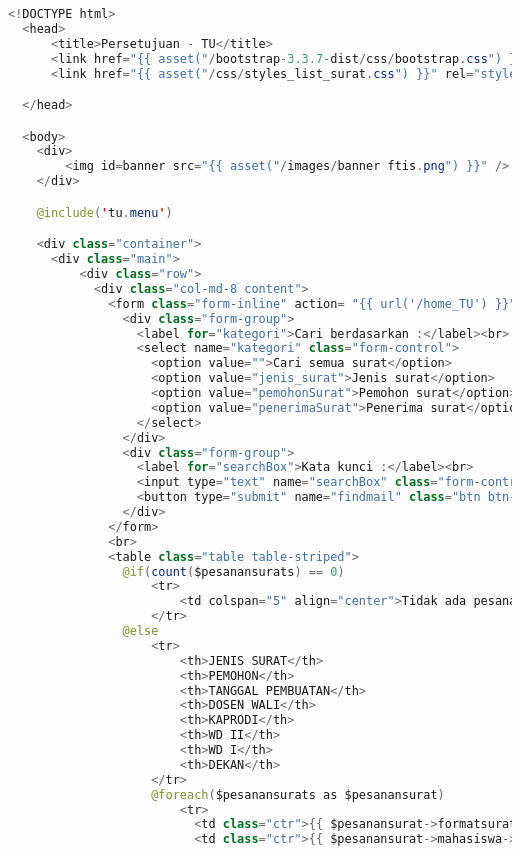 \begin{lstlisting}[language=Java,basicstyle=\tiny,caption=Persetujuan surat]
<!DOCTYPE html>
  <head>
      <title>Persetujuan - TU</title>
      <link href="{{ asset("/bootstrap-3.3.7-dist/css/bootstrap.css") }}" rel="stylesheet" type="text/css" />
      <link href="{{ asset("/css/styles_list_surat.css") }}" rel="stylesheet" type="text/css">

  </head>

  <body>
    <div>
        <img id=banner src="{{ asset("/images/banner ftis.png") }}" />
    </div>

    @include('tu.menu')

    <div class="container">
      <div class="main">
          <div class="row">
            <div class="col-md-8 content">
              <form class="form-inline" action= "{{ url('/home_TU') }}" method="get">
                <div class="form-group">
                  <label for="kategori">Cari berdasarkan :</label><br>
                  <select name="kategori" class="form-control">
                    <option value="">Cari semua surat</option>
                    <option value="jenis_surat">Jenis surat</option>
                    <option value="pemohonSurat">Pemohon surat</option>
                    <option value="penerimaSurat">Penerima surat</option>
                  </select>
                </div>
                <div class="form-group">
                  <label for="searchBox">Kata kunci :</label><br>
                  <input type="text" name="searchBox" class="form-control" size="69" />
                  <button type="submit" name="findmail" class="btn btn-primary">Cari surat</button>
                </div>
              </form>
              <br>
              <table class="table table-striped">
                @if(count($pesanansurats) == 0)
                    <tr>
                        <td colspan="5" align="center">Tidak ada pesanan surat ...</td>
                    </tr>
                @else
                    <tr>
                        <th>JENIS SURAT</th>
                        <th>PEMOHON</th>
                        <th>TANGGAL PEMBUATAN</th>
                        <th>DOSEN WALI</th>
                        <th>KAPRODI</th>
                        <th>WD II</th>
                        <th>WD I</th>
                        <th>DEKAN</th>
                    </tr>
                    @foreach($pesanansurats as $pesanansurat)
                        <tr>
                          <td class="ctr">{{ $pesanansurat->formatsurat->jenis_surat }}</td>
                          <td class="ctr">{{ $pesanansurat->mahasiswa->nama_mahasiswa }}</td>

\end{lstlisting}
